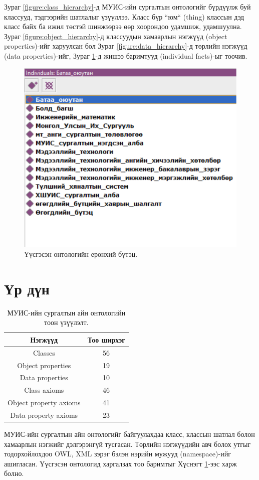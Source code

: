\documentclass[conference, a4paper, mongolian]{myIEEEtran}
\begin{document}
Зураг \ref{figure:class_hierarchy}-д МУИС-ийн сургалтын онтологийг бүрдүүлж буй классууд, тэдгээрийн шатлалыг үзүүллээ. Класс бүр ``юм`` (thing) классын дэд класс байх ба ижил төстэй шинжээрээ өөр хоорондоо удамшиж, удамшуулна. Зураг \ref{figure:object_hierarchy}-д классуудын хамаарлын нэгжүүд (object properties)-ийг харуулсан бол Зураг \ref{figure:data_hierarchy}-д төрлийн нэгжүүд (data properties)-ийг, Зураг \ref{figure:individuals}-д жишээ баримтууд (individual facts)-ыг тоочив.
%
\begin{figure}[t]
	\centering		
	\includegraphics[width=0.8\linewidth]{figures/individuals}
	\caption{Үүсгэсэн онтологийн ерөнхий бүтэц.}
	\label{figure:individuals}
\end{figure}
%
\section{Үр дүн}
%
\begin{table}[b]
	\renewcommand{\arraystretch}{1.2}
	\centering
	\caption{МУИС-ийн сургалтын айн онтологийн тоон үзүүлэлт.}
	\label{table:1}
	\begin{tabular}{|c||c|}
		\hline
		\textbf{Нэгжүүд}       & \textbf{Тоо ширхэг} \\ \hline \hline
		Classes                & 56  \\ \hline
		Object properties      & 19  \\ \hline
		Data properties        & 10   \\ \hline
		Class axioms           & 46  \\ \hline
		Object property axioms & 41  \\ \hline
		Data property axioms   & 23  \\ \hline
	\end{tabular}
\end{table}
%
МУИС-ийн сургалтын айн онтологийг байгуулахдаа класс, классын шатлал болон хамаарлын нэгжийг дэлгэрэнгүй тусгасан. Төрлийн нэгжүүдийн авч болох утгыг тодорхойлохдоо OWL, XML зэрэг бэлэн нэрийн мужууд (namespace)-ийг ашигласан. Үүсгэсэн онтологид харгалзах тоо баримтыг Хүснэгт \ref{table:1}-ээс харж болно.
\end{document}
